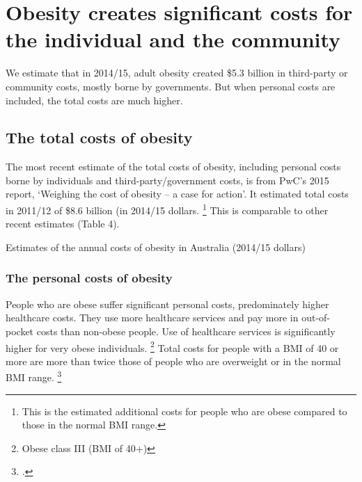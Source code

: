 \documentclass[embargoed]{grattan}
\begin{document}
\chapter{Obesity creates significant costs for the individual and the community}\label{obesity-creates-significant-costs-for-the-individual-and-society}

We estimate that in 2014/15, adult obesity created \$5.3 billion in third-party or community costs, mostly borne by governments.
But when personal costs are included, the total costs are much higher.

\section{The total costs of obesity }\label{the-total-costs-of-obesity}

The most recent estimate of the total costs of obesity, including personal costs borne by individuals and third-party/government costs, is from PwC's 2015 report, `Weighing the cost of obesity -- a case for action'.
It estimated total costs in 2011/12 of \$8.6 billion (in 2014/15 dollars.%
\footnote{This is the estimated additional costs for people who are obese compared to those in the normal BMI range.} This is comparable to other recent estimates (Table 4).

\begin{table}
\caption{Estimates of the annual costs of obesity in Australia (2014/15 dollars)}




\end{table}

\subsection{The personal costs of obesity }\label{the-personal-costs-of-obesity}

People who are obese suffer significant personal costs, predominately higher healthcare costs.
They use more healthcare services and pay more in out-of-pocket costs than non-obese people.
Use of healthcare services is significantly higher for very obese individuals.%
\footnote{Obese class III (BMI of 40+)} Total costs for people with a BMI of 40 or more are more than twice those of people who are overweight or in the normal BMI range.%
\footcites{PwC2015Weighingcostobesity}{Park2012impactchildhoodobesity}{Australia2014NoTimeWeight}
\end{document}

